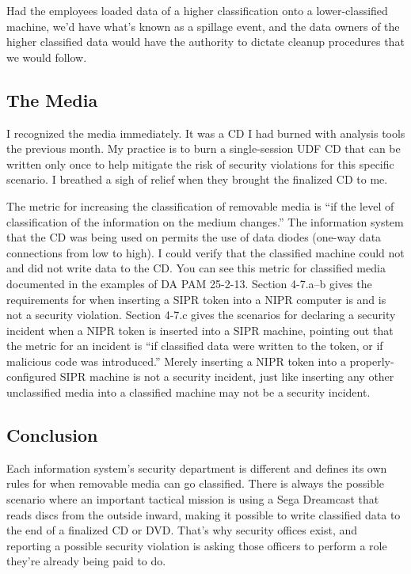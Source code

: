 Had the employees loaded data of a higher classification onto a lower-classified machine, we'd have what's known as a spillage event, and the data owners of the higher classified data would have the authority to dictate cleanup procedures that we would follow.

\subsection{The Media}
I recognized the media immediately. It was a CD I had burned with analysis tools the previous month. My practice is to burn a single-session UDF CD that can be written only once to help mitigate the risk of security violations for this specific scenario. I breathed a sigh of relief when they brought the finalized CD to me.

The metric for increasing the classification of removable media is ``if the level of classification of the information on the medium changes.''\autocite[§ 4.b]{20220202:dodm520001mvol2} The information system that the CD was being used on permits the use of data diodes (one-way data connections from low to high). I could verify that the classified machine could not and did not write data to the CD. You can see this metric for classified media documented in the examples of DA PAM 25-2-13. Section 4-7.a--b gives the requirements for when inserting a SIPR token into a NIPR computer is and is not a security violation. Section 4-7.c gives the scenarios for declaring a security incident when a NIPR token is inserted into a SIPR machine, pointing out that the metric for an incident is ``if classified data were written to the token, or if malicious code was introduced.''\autocite{20220202:dapam25-2-13} Merely inserting a NIPR token into a properly-configured SIPR machine is not a security incident, just like inserting any other unclassified media into a classified machine may not be a security incident.

\subsection{Conclusion}
Each information system's security department is different and defines its own rules for when removable media can go classified. There is always the possible scenario where an important tactical mission is using a Sega Dreamcast that reads discs from the outside inward, making it possible to write classified data to the end of a finalized CD or DVD. That's why security offices exist, and reporting a possible security violation is asking those officers to perform a role they're already being paid to do.


